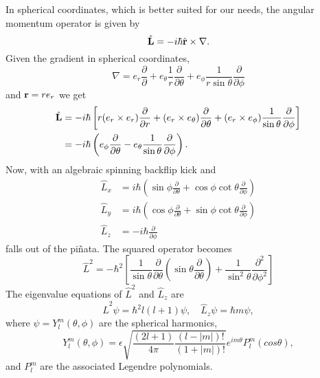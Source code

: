     In spherical coordinates, which is better suited for our needs, the angular 
    momentum operator is given by
    \begin{equation}
        \hat{\vb{L}} = -i\hbar \hat{\vb{r}} \times \nabla.
    \end{equation}
    Given the gradient in spherical coordinates,
    \begin{equation}
        \nabla = 
          e_r \frac{\partial}{\partial} 
        + e_\theta \frac{1}{r} \frac{\partial}{\partial \theta}
        + e_\phi \frac{1}{r\sin \theta} \frac{\partial}{\partial \phi}
    \end{equation}
    and $\vb{r} = re_r$ we get 
    \begin{equation}
        \begin{aligned}
        \hat{\vb{L}}
        &= 
        -i\hbar\left[ 
              r(e_r \times e_r)\frac{\partial}{\partial r} 
            + (e_r \times e_\theta)\frac{\partial}{\partial \theta}
            + (e_r \times e_\phi) \frac{1}{\sin\theta} \frac{\partial}{\partial \phi}  
        \right] \\
        &=
        -i\hbar \left( 
        e_\phi \frac{\partial}{\partial \theta}
        - e_\theta \frac{1}{\sin\theta}\frac{\partial}{\partial \phi}     
        \right).
        \end{aligned}
    \end{equation}
    Now, with an algebraic spinning backflip kick and 
    \begin{align}
        \hat{L}_x &= i\hbar \left(
            \sin\phi \frac{\partial}{\partial\theta}
            +\cos\phi\cot\theta\frac{\partial}{\partial \phi}
        \right) \\
        \hat{L}_y &= i\hbar \left(
            \cos\phi \frac{\partial}{\partial\theta}
            +\sin\phi\cot\theta\frac{\partial}{\partial \phi}
        \right) \\
        \hat{L}_z &= -i\hbar \frac{\partial}{\partial \phi}
    \end{align}
    falls out of the piñata.
    The squared operator becomes
    \begin{equation}
        \hat{L}^2 = -\hbar^2 \left[
        \frac{1}{\sin\theta}\frac{\partial}{\partial\theta}
            \left(\sin\theta\frac{\partial}{\partial\theta} \right)
        + \frac{1}{\sin^2\theta}\frac{\partial^2}{\partial\phi^2}
        \right]
    \end{equation}
    The eigenvalue equations of $\hat{L}^2$ and $\hat{L}_z$ are
    \begin{equation}
        \hat{L}^2\psi = \hbar^2l(l + 1)\psi, \quad \hat{L}_z\psi = \hbar m \psi,
    \end{equation}
    where $\psi = Y^m_l(\theta, \phi)$ are the spherical harmonics,
    \begin{equation}
        Y^m_l (\theta, \phi) 
            = 
            \epsilon\sqrt{\frac{(2l + 1)}{4\pi}\frac{(l - |m|)!}{(1 + |m|)!}}
            e^{im\theta} P^m_l(cos\theta),
    \end{equation}
    and $P^m_l$ are the associated Legendre polynomials.

